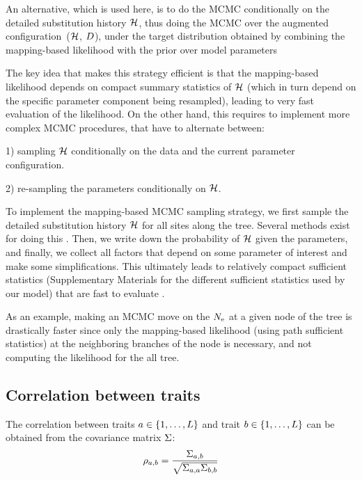 An alternative, which is used here, is to do the MCMC conditionally on the detailed substitution history $\mathcal{H}$, thus doing the MCMC over the augmented configuration~($\mathcal{H}$, $D$), under the target distribution obtained by combining the mapping-based likelihood with the prior over model parameters

The key idea that makes this strategy efficient is that the mapping-based likelihood depends on
compact summary statistics of $\mathcal{H}$ (which in turn depend on the specific parameter component
being resampled), leading to very fast evaluation of the likelihood.
On the other hand, this requires to implement more complex MCMC procedures, that have to alternate between:

1) sampling $\mathcal{H}$ conditionally on the data and the current parameter configuration.

2) re-sampling the parameters conditionally on $\mathcal{H}$.

To implement the mapping-based MCMC sampling strategy, we first sample the detailed substitution history $\mathcal{H}$ for all sites along the tree.
Several methods exist for doing this \citep{Nielsen2002,Rodrigue2008}.
Then, we write down the probability of $\mathcal{H}$ given the parameters, and finally, we collect all factors that depend on some parameter of interest and make some simplifications.
This ultimately leads to relatively compact sufficient statistics (Supplementary Materials for the different sufficient statistics used by our model) that are fast to evaluate \citep{Irvahn2014,Davydov2016}.

As an example, making an MCMC move on the $N_{\mathrm{e}}$ at a given node of the tree is drastically faster since only the mapping-based likelihood (using path sufficient statistics) at the neighboring branches of the node is necessary, and not computing the likelihood for the all tree.
\\

\subsection{Correlation between traits}
\label{sec:Correlation}
The correlation between traits $a \in \{1, \hdots, L\}$ and trait $b \in \{1, \hdots, L\}$ can be obtained from the covariance matrix $\Sigma$:
\begin{equation}
\rho_{a, b} = \dfrac{\Sigma_{a, b}}{\sqrt{\Sigma_{a, a} \Sigma_{b, b}}}
\end{equation}


